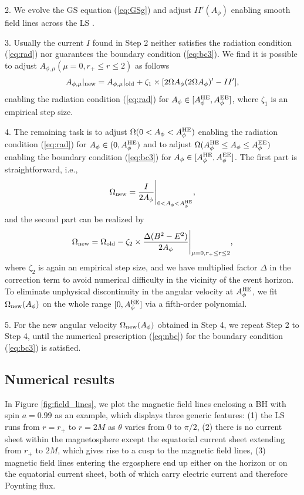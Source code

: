 \documentclass[aps,prd,reprint,nofootinbib, superscriptaddress]{revtex4-1}
\def\Ap{A_\phi}
\def\Am{A_{\phi,\mu}}
\def\be{\begin{equation}}
\def\ee{\end{equation}}
\def\AHE{A_\phi^{\rm HE}}
\def\AEE{A_\phi^{\rm EE}}
\begin{document}
2. We evolve the GS equation (\ref{eq:GSg}) and adjust $II'(\Ap)$ enabling smooth field lines across the LS
\cite[see e.g.][for details]{Contopoulos2013, Nathanail2014, Pan2016a, Mahlmann2018}.

3. Usually the current $I$ found in Step 2 neither satisfies the radiation condition (\ref{eq:rad})
nor guarantees the boundary condition (\ref{eq:bc3}). We find it is possible to adjust
$\Am(\mu = 0, r_+ \leq r\leq 2)$ as follows
\be
 A_{\phi,\mu}|_{\rm new}  = A_{\phi,\mu}|_{\rm old} + \zeta_1\times[2\Omega\Ap(2\Omega\Ap)' -II'],
\ee
enabling the radiation condition (\ref{eq:rad}) for
$A_\phi\in [A_\phi^{\rm HE}, A_\phi^{\rm EE}]$, where $\zeta_1$ is an
empirical step size.

4. The remaining task is to adjust  $\Omega(0< \Ap < \AHE)$ enabling  the radiation condition (\ref{eq:rad})
 for $A_\phi \in (0, A_\phi^{\rm HE})$ and  to adjust $\Omega(\AHE \leq \Ap \leq \AEE)$
 enabling the boundary condition (\ref{eq:bc3}) for $\Ap \in [\AHE, \AEE]$.
 The first part is straightforward, i.e.,
 \be
\Omega_{\rm new} = \frac{I}{2\Ap}\Bigg|_{0 < \Ap < \AHE},
 \ee
 and the second part can be realized by
 \be
\Omega_{\rm new}  = \Omega_{\rm old} - \zeta_2\times\frac{\Delta (B^2-E^2)}{2\Ap}\Bigg|_{\mu=0, r_+\leq r \leq 2},
 \ee
 where $\zeta_2$ is again an empirical step size, and we have multiplied factor $\Delta$
 in the correction term to avoid numerical difficulty in the vicinity of the event horizon.
 To eliminate unphysical discontinuity in the angular
 velocity at $\AHE$, we fit $\Omega_{\rm new}(\Ap)$ on the whole range
 $[0, \AEE]$ via a fifth-order polynomial.

 5. For the new angular velocity $\Omega_{\rm new}(\Ap)$ obtained in Step 4, we repeat Step 2 to Step 4,
 until the numerical prescription (\ref{eq:nbc}) for the boundary condition (\ref{eq:bc3}) is satisfied.

\subsection{Numerical results}

In Figure \ref{fig:field_lines}, we plot the magnetic field lines enclosing a BH with spin $a =0.99$ as an example,
which displays three generic features: (1) the LS runs from $r=r_+$ to $r=2M$ as $\theta$ varies from $0$ to $\pi/2$,
(2) there is no current sheet within the magnetosphere except the equatorial current sheet extending from $r_+$ to $2M$,
which gives rise to a cusp to the magnetic field lines,
(3) magnetic field lines entering the ergosphere end up either on the horizon or on the equatorial current sheet,
both of which carry electric current and therefore Poynting flux.
\end{document}
